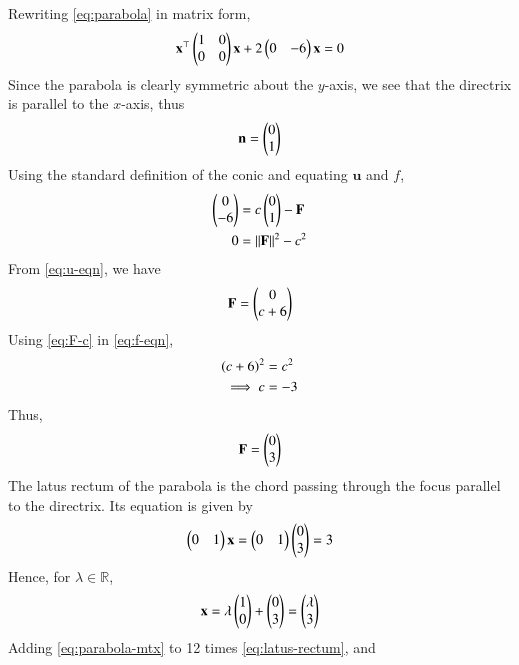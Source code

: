 \documentclass[journal,12pt,twocolumn]{IEEEtran}
\renewcommand{\vec}[1]{\boldsymbol{\mathbf{#1}}}
\begin{document}
\begin{enumerate}
    \solution Rewriting \eqref{eq:parabola} in matrix form,
    \begin{align}
        \vec{x}^\top\myvec{1&0\\0&0}\vec{x} + 2\myvec{0&-6}\vec{x} = 0
        \label{eq:parabola-mtx}
    \end{align}
    Since the parabola is clearly symmetric about the $y$-axis, we see that
    the directrix is parallel to the $x$-axis, thus
    \begin{align}
        \vec{n} = \myvec{0\\1}
        \label{eq:n}
    \end{align}
    Using the standard definition of the conic and equating $\vec{u}$ and $f$,
    \begin{align}
        \myvec{0\\-6} &= c\myvec{0\\1} - \vec{F} \label{eq:u-eqn} \\
        0 &= \norm{\vec{F}}^2 - c^2 \label{eq:f-eqn}
    \end{align}
    From \eqref{eq:u-eqn}, we have
    \begin{align}
        \vec{F} = \myvec{0\\c+6}
        \label{eq:F-c}
    \end{align}
    Using \eqref{eq:F-c} in \eqref{eq:f-eqn},
    \begin{align}
        \left(c+6\right)^2&=c^2 \\
        \implies c&=-3
        \label{eq:c-sol}
    \end{align}
    Thus,
    \begin{align}
        \vec{F} = \myvec{0\\3}
    \end{align}
    The latus rectum of the parabola is the chord passing through the focus 
    parallel to the directrix. Its equation is given by
    \begin{align}
        \myvec{0&1}\vec{x} = \myvec{0&1}\myvec{0\\3} = 3
        \label{eq:latus-rectum}
    \end{align}
    Hence, for $\lambda \in \mathbb{R}$,
    \begin{align}
        \vec{x} = \lambda\myvec{1\\0} + \myvec{0\\3} = \myvec{\lambda\\3}
        \label{eq:x-general}
    \end{align}
    Adding \eqref{eq:parabola-mtx} to 12 times \eqref{eq:latus-rectum}, and

\end{enumerate}
\end{document}

